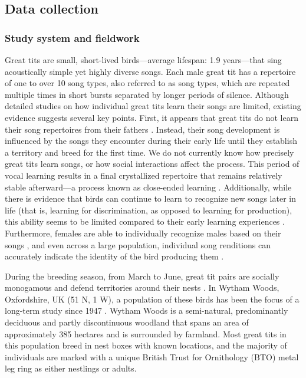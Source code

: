 \subsection{Data collection}

\subsubsection{Study system and fieldwork}

Great tits are small, short-lived birds---average lifespan: 1.9 years---that sing acoustically simple yet highly diverse songs. Each male great tit has a repertoire of one to over 10 song types, also referred to as song types, which are repeated multiple times in short bursts separated by longer periods of silence. Although detailed studies on how individual great tits learn their songs are limited, existing evidence suggests several key points. First, it appears that great tits do not learn their song repertoires from their fathers \autocite{mcgregor1982b}. Instead, their song development is influenced by the songs they encounter during their early life until they establish a territory and breed for the first time. We do not currently know how precisely great tits learn songs, or how social interactions affect the process. This period of vocal learning results in a final crystallized repertoire that remains relatively stable afterward---a process known as close-ended learning \autocite{rivera-gutierrez2011}. Additionally, while there is evidence that birds can continue to learn to recognize new songs later in life (that is, learning for  discrimination, as opposed to learning for production), this ability seems to be limited compared to their early learning experiences \autocite{mcgregor1986}. Furthermore, females are able to individually recognize males based on their songs \autocite{lind1996}, and even across a large population, individual song renditions can accurately indicate the identity of the bird producing them \autocite{merinorecalde2023a}.

During the breeding season, from March to June, great tit pairs are socially monogamous and defend territories around their nests \autocite{hinde1952}. In Wytham Woods, Oxfordshire, UK (51 N, 1 W), a population of these birds has been the focus of a long-term study since 1947 \autocite{lack1964}. Wytham Woods is a semi-natural, predominantly deciduous and partly discontinuous woodland that spans an area of approximately 385 hectares and is surrounded by farmland. Most great tits in this population breed in nest boxes with known locations, and the majority of individuals are marked with a unique British Trust for Ornithology (BTO) metal leg ring as either nestlings or adults.

